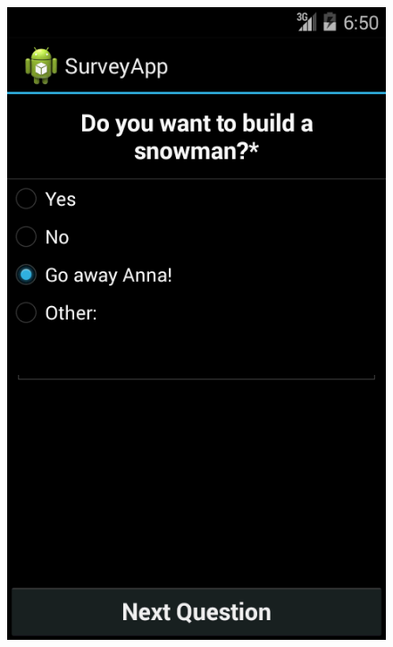 \documentclass[runningheads,a4paper]{llncs}
\begin{document}
\begin{figure}[htb]
{	\includegraphics[scale=0.22]{images/android/android_1}}
	\subfigure[Question 2]{
}
\end{figure}
\end{document}
